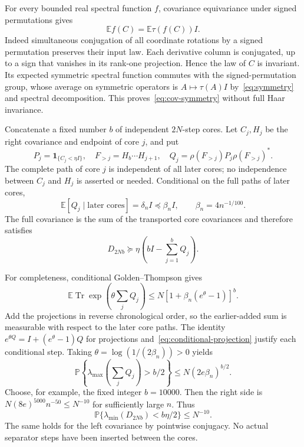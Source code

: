 \documentclass[11pt]{article}
\theoremstyle{definition}\newtheorem{definition}[theorem]{Definition}
\theoremstyle{remark}\newtheorem{remark}[theorem]{Remark}
\DeclareMathOperator{\Tr}{Tr}
\newcommand{\E}{\mathbb E}
\newcommand{\PP}{\mathbb P}
\newcommand{\one}{\mathbf1}
\begin{document}
For every bounded real spectral function $f$, covariance equivariance under signed permutations gives
\begin{equation}\label{eq:cov-symmetry}
 \E f(C)=\E\tau(f(C))I.
\end{equation}
Indeed simultaneous conjugation of all coordinate rotations by a signed permutation preserves their input law. Each derivative column is conjugated, up to a sign that vanishes in its rank-one projection. Hence the law of $C$ is invariant. Its expected symmetric spectral function commutes with the signed-permutation group, whose average on symmetric operators is $A\mapsto\tau(A)I$ by~\eqref{eq:symmetry} and spectral decomposition. This proves~\eqref{eq:cov-symmetry} without full Haar invariance.

Concatenate a fixed number $b$ of independent $2N$-step cores. Let $C_j,H_j$ be the right covariance and endpoint of core $j$, and put
\[
 P_j=\one_{\{C_j<\eta I\}},\quad
 F_{>j}=H_b\cdots H_{j+1},\quad
 Q_j=\rho(F_{>j})P_j\rho(F_{>j})^*.
\]
The complete path of core $j$ is independent of all later cores; no independence between $C_j$ and $H_j$ is asserted or needed. Conditional on the full paths of later cores,
\begin{equation}\label{eq:conditional-projection}
 \E[Q_j\mid\text{later cores}]=\delta_n I\preceq\beta_n I,
 \qquad \beta_n=4n^{-1/100}.
\end{equation}
The full covariance is the sum of the transported core covariances and therefore satisfies
\[
 D_{2Nb}\succeq\eta\left(bI-\sum_{j=1}^bQ_j\right).
\]

For completeness, conditional Golden--Thompson gives
\[
 \E\Tr\exp\left(\theta\sum_jQ_j\right)
 \le N[1+\beta_n(e^\theta-1)]^b.
\]
Add the projections in reverse chronological order, so the earlier-added sum is measurable with respect to the later core paths. The identity $e^{\theta Q}=I+(e^\theta-1)Q$ for projections and~\eqref{eq:conditional-projection} justify each conditional step. Taking $\theta=\log(1/(2\beta_n))>0$ yields
\begin{equation}\label{eq:proj-tail}
 \PP\left\{\lambda_{\max}\left(\sum_jQ_j\right)>b/2\right\}
 \le N(2e\beta_n)^{b/2}.
\end{equation}
Choose, for example, the fixed integer $b=10000$. Then the right side is
$N(8e)^{5000}n^{-50}\le N^{-10}$ for sufficiently large $n$. Thus
\begin{equation}\label{eq:whole-cov}
 \PP\{\lambda_{\min}(D_{2Nb})<b\eta/2\}\le N^{-10}.
\end{equation}
The same holds for the left covariance by pointwise conjugacy. No actual separator steps have been inserted between the cores.
\end{document}
